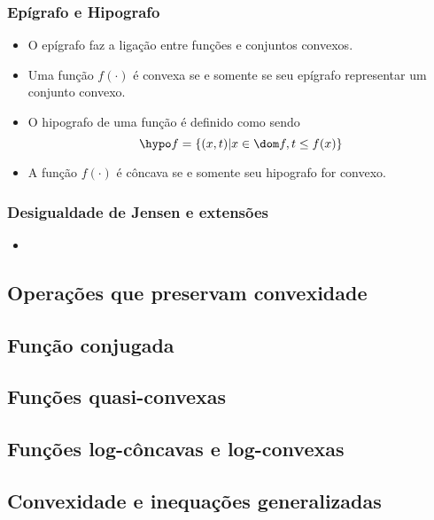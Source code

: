 \begin{frame}
  \frametitle{\normalsize Epígrafo e Hipografo}
  \begin{itemize}
    \item O epígrafo faz a ligação entre funções e conjuntos convexos.
    \item Uma função $f(\cdot)$ é convexa se e somente se seu epígrafo representar um conjunto convexo.
    \item O hipografo de uma função é definido como sendo
    \begin{equation}
      \hypo f = \{ (x, t) | x \in \dom f, t \leq f(x) \}
    \end{equation}
    \item A função $f(\cdot)$ é côncava se e somente seu hipografo for \alert{convexo}.
  \end{itemize}
\end{frame}

\begin{frame}
  \frametitle{\normalsize Desigualdade de Jensen e extensões}
  \begin{itemize}
    \item 
  \end{itemize}
\end{frame}

\subsection{Operações que preservam convexidade}

\subsection{Função conjugada}

\subsection{Funções quasi-convexas}

\subsection{Funções log-côncavas e log-convexas}

\subsection{Convexidade e inequações generalizadas}

